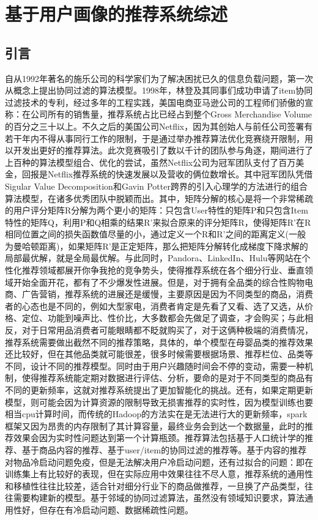 \chapter{基于用户画像的推荐系统综述}
	\section{引言}
	自从1992年著名的施乐公司的科学家们为了解决困扰已久的信息负载问题，第一次从概念上提出协同过滤的算法模型。1998年，林登及其同事们成功申请了item协同过滤技术的专利，经过多年的工程实践，美国电商亚马逊公司的工程师们骄傲的宣称：在公司所有的销售量，推荐系统占比已经占到整个Gross Merchandise Volume的百分之三十以上。不久之后的美国公司Netflix，因为其创始人与前任公司签署有若干年内不得从事同行工作的限制，于是通过举办推荐算法优化竞赛绕开限制，用以开发出更好的推荐算法。此次竞赛吸引了数以千计的团队参与角逐，期间进行了上百种的算法模型组合、优化的尝试，虽然Netflix公司为冠军团队支付了百万美金，回报是Netflix推荐系统的快速发展以及营收的俩位数增长。其中冠军团队凭借Sigular Value Decomposition和Gavin Potter跨界的引入心理学的方法进行的组合算法模型，在诸多优秀团队中脱颖而出。其中，矩阵分解的核心是将一个非常稀疏的用户评分矩阵R分解为两个更小的矩阵：只包含User特性的矩阵P和只包含Item特性的矩阵Q，利用P和Q相乘的结果R'来拟合原来的评分矩阵R，使得矩阵R'在R相同位置之间的损失函数值尽量的小，通过定义一个R和R'之间的距离定义(一般为曼哈顿距离)，如果矩阵R'是正定矩阵，那么把矩阵分解转化成梯度下降求解的局部最优解，就是全局最优解。与此同时，Pandora、LinkedIn、Hulu等网站在个性化推荐领域都展开你争我抢的竞争势头，使得推荐系统在各个细分行业、垂直领域开始全面开花，都有了不少爆发性进展。但是，对于拥有全品类的综合性购物电商、广告营销，推荐系统的进展还是缓慢，主要原因是因为不同类型的商品，消费者的心态也是不同的，例如大型家电，消费者肯定是先看了又看、选了又选，从价格、定位、功能到噪声比、性价比，大多数都会先做足了调查，才会购买；与此相反，对于日常用品消费者可能眼睛都不眨就购买了，对于这俩种极端的消费情况，推荐系统需要做出截然不同的推荐策略，具体的，单个模型在母婴品类的推荐效果还比较好，但在其他品类就可能很差，很多时候需要根据场景、推荐栏位、品类等不同，设计不同的推荐模型。同时由于用户兴趣随时间会不停的变动，需要一种机制，使得推荐系统能定期对数据进行评估、分析，要命的是对于不同类型的商品有不同的更新频率，这就对推荐系统提出了更加智能化的挑战。还有，如果定期更新模型，则可能会因为计算资源的限制导致无损害推荐的实时性，因为模型训练也要相当cpu计算时间，而传统的Hadoop的方法实在是无法进行大的更新频率，spark框架又因为昂贵的内存限制了其计算容量，最终业务会到达一个数据量，此时的推荐效果会因为实时性问题达到第一个计算瓶颈。推荐算法包括基于人口统计学的推荐\citep{social-filter}、基于商品内容的推荐\citep{content-based}、基于user/item的协同过滤\citep{collab-filter}的推荐等。基于内容的推荐\citep{recmd_content_based}对物品冷启动问题免疫，但是无法解决用户冷启动问题\citep{cold-start}，还有过拟合的问题：即在训练集上有比较好的表现，但在实际应用中效果往往不尽人意，推荐系统的通用性和移植性往往比较差，适合针对细分行业下的商品做推荐，一旦换了产品类型，往往需要构建新的模型。基于邻域的协同过滤算法，虽然没有领域知识要求，算法通用性好，但存在有冷启动问题、数据稀疏性问题。


